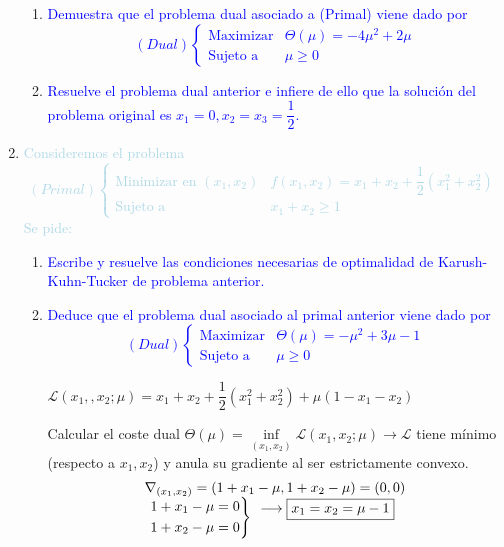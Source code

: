 \documentclass[a4paper]{article}
\newcommand{\lb}[1]{\textcolor{lightblue}{#1}}
\newcommand{\db}[1]{\textcolor{blue}{#1}}
\begin{document}
\begin{enumerate}[label=\color{red}\arabic*.]
\begin{enumerate}[label=\color{red}\alph*)]
    	\item \db{Demuestra que el problema dual asociado a (Primal) viene dado por \[ (Dual)\begin{cases}
    	\text{Maximizar} & \Theta(\mu)=-4\mu^2+2\mu\\
    	\text{Sujeto a }& \mu\ge0
    	\end{cases} \]}
    	
    	\item \db{Resuelve el problema dual anterior e infiere de ello que la solución del problema original es $x_1=0,x_2=x_3=\dfrac{1}{2}$.}
    \end{enumerate}
    \item \lb{Consideremos el problema \[ (Primal)\begin{cases}
    \text{Minimizar en }(x_1,x_2) & f(x_1,x_2)=x_1+x_2+\dfrac{1}{2}(x_1^2+x_2^2)\\
    \text{Sujeto a} & x_1+x_2\ge1
    \end{cases} \]Se pide:}
    \begin{enumerate}[label=\color{red}\alph*)]
    	\item \db{Escribe y resuelve las condiciones necesarias de optimalidad de Karush-Kuhn-Tucker de problema anterior.}
    	
    	\item \db{Deduce que el problema dual asociado al primal anterior viene dado por \[ (Dual)\begin{cases}
    	\text{Maximizar} & \Theta(\mu)=-\mu^2+3\mu-1\\
    	\text{Sujeto a }& \mu\ge0
    	\end{cases} \]}
    	
    	$\mathcal{L}(x_1,,x_2;\mu)=x_1+x_2+\dfrac{1}{2}(x_1^2+x_2^2)+\mu(1-x_1-x_2)$
    	
    	Calcular el coste dual $\Theta(\mu)=\underset{(x_1,x_2)}{\inf}\mathcal{L}(x_1,x_2;\mu)\longrightarrow\mathcal{L}$ tiene mínimo (respecto a $x_1,x_2$) y anula su gradiente al ser estrictamente convexo. \[ \begin{array}{c}
    	\nabla_{(x_1,x_2)}=(1+x_1-\mu, 1+x_2-\mu)=(0,0) \\
    	\begin{rcases}
    	1+x_1-\mu=0\\
    	1+x_2-\mu=0
    	\end{rcases}\begin{array}{l}
    	\longrightarrow \boxed{x_1=x_2=\mu-1}\\
    	\\
    	\end{array}
    	\end{array}\]
    	

\end{enumerate}
\end{enumerate}
\end{document}
